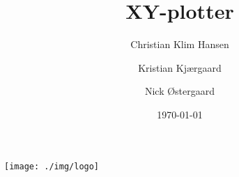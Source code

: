\documentclass{../mypaper}
\title{XY-plotter}
\author{Christian Klim Hansen \and Kristian Kjærgaard \and Nick Østergaard}
\date{\today}
\begin{document}
\begin{titlingpage}
  \maketitle
  \texttt{[image: ./img/logo]}
\end{titlingpage}

\frontmatter

\tableofcontents



\mainmatter







\listoffigures

\listoftables

\listoffixmes
\end{document}
